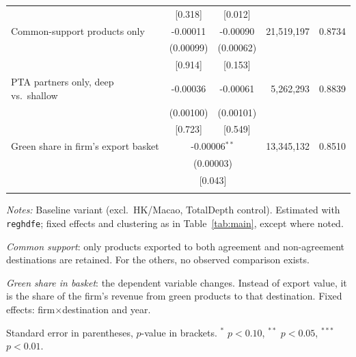 \begin{table}[htbp]
\begin{threeparttable}
\begin{tabular}{lccrc}
 & [0.318] & [0.012] & & \\
\addlinespace
Common-support products only & -0.00011 & -0.00090 & 21,519,197 & 0.8734 \\
 & (0.00099) & (0.00062) & & \\
 & [0.914] & [0.153] & & \\
\addlinespace
PTA partners only, deep vs.\ shallow & -0.00036 & -0.00061 & 5,262,293 & 0.8839 \\
 & (0.00100) & (0.00101) & & \\
 & [0.723] & [0.549] & & \\
\addlinespace
Green share in firm's export basket & \multicolumn{2}{c}{-0.00006$^{**}$} & 13,345,132 & 0.8510 \\
 & \multicolumn{2}{c}{(0.00003)} & & \\
 & \multicolumn{2}{c}{[0.043]} & & \\
\addlinespace
\bottomrule
\end{tabular}
\begin{tablenotes}[flushleft]\footnotesize
\item \emph{Notes:} Baseline variant (excl.\ HK/Macao, TotalDepth control). Estimated with \texttt{reghdfe}; fixed effects and clustering as in Table~\ref{tab:main}, except where noted.
\item \textit{Common support}: only products exported to both agreement and non-agreement destinations are retained. For the others, no observed comparison exists.
\item \textit{Green share in basket}: the dependent variable changes. Instead of export value, it is the share of the firm's revenue from green products to that destination. Fixed effects: firm$\times$destination and year.
\item Standard error in parentheses, $p$-value in brackets. $^{*}$ $p<0.10$, $^{**}$ $p<0.05$, $^{***}$ $p<0.01$.
\end{tablenotes}
\end{threeparttable}
\end{table}
